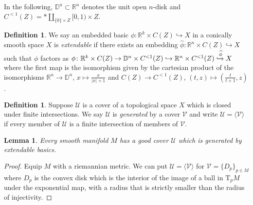 \documentclass[11pt]{amsart}
\newcommand{\mcal}[1]{\mathcal{#1}}
\newcommand{\mbb}[1]{\mathbb{#1}}
\newcommand{\R}{\mbb{R}}
\newcommand{\Tangent}{\mathrm{T}}
\numberwithin{equation}{section}
\theoremstyle{definition}
\newtheorem{definition}[equation]{Definition}%
\theoremstyle{remark}
\theoremstyle{plain}
\newtheorem{lemma}[equation]{Lemma}
\begin{document}
In the following, $\mbb{D}^n\subset\R^n$ denotes the unit open $n$-disk and $C^{<1}(Z)=\ast\amalg_{\{0\}\times Z}[0,1)\times Z$.

\begin{definition}
    We say an embedded basic $\phi\colon \R^k\times C(Z)\hookrightarrow X$ in a conically smooth space $X$ is \emph{extendable} if there exists an embedding $\widehat{\phi}\colon\R^n\times C(Z)\hookrightarrow X$ such that $\phi$ factors as $\phi\colon\R^{k}\times C(Z)\to \mbb{D}^n\times C^{<1}(Z)\hookrightarrow \R^n\times C^{<1}(Z)\xhookrightarrow{\widehat{\phi}}X$ where the first map is the isomorphism given by the cartesian product of the isomorphisms $\R^n\to\mbb{D}^n$, $x\mapsto \frac{x}{|x|+1}$ and $C(Z)\to C^{<1}(Z)$, $(t,z)\mapsto (\frac{t}{t+1},z)$. 
\end{definition}

\begin{definition}
    Suppose $\mcal{U}$ is a cover of a topological space $X$ which is closed under finite intersections. We say $\mcal{U}$ is \emph{generated} by a cover $\mcal{V}$ and write $\mcal{U}=\langle\mcal{V}\rangle$ if every member of $\mcal{U}$ is a finite intersection of members of $\mcal{V}$.
\end{definition}

\begin{lemma}\label{2978BNV}
    Every smooth manifold $M$ has a good cover $\mcal{U}$ which is generated by extendable basics.
\end{lemma}
\begin{proof}
    Equip $M$ with a riemannian metric. We can put $\mcal{U}=\langle\mcal{V}\rangle$ for $\mcal{V}=\{D_p\}_{p\in M}$ where $D_p$ is the convex disk which is the interior of the image of a ball in $\Tangent_p M$ under the exponential map, with a radius that is strictly smaller than the radius of injectivity.
\end{proof}
\end{document}
